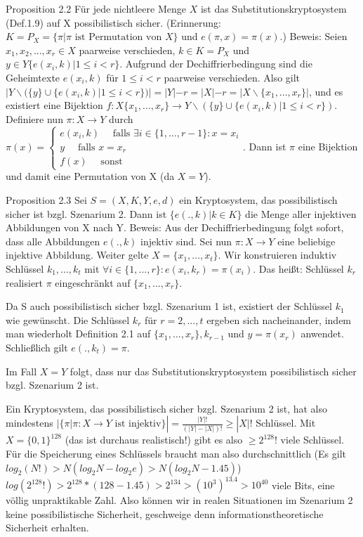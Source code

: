 \documentclass[a4paper]{article}
\begin{document}
\begin{multicols}{3}
    Proposition 2.2 Für jede nichtleere Menge $X$ ist das Substitutionskryptosystem (Def.1.9) auf X possibilistisch sicher. (Erinnerung: $K=P_X=\{\pi|\pi\text{ ist Permutation von }X\}$ und $e(\pi,x)=\pi(x)$.)
    Beweis: Seien $x_1,x_2,...,x_r\in X$ paarweise verschieden, $k\in K=P_X$ und $y\in Y\{e(x_i,k)|1\leq i<r\}$. Aufgrund der Dechiffrierbedingung sind die Geheimtexte $e(x_i,k)$ für $1\leq i<r$ paarweise verschieden. Also gilt $|Y\backslash(\{y\}\cup\{e(x_i,k)| 1\leq i<r\})|=|Y|-r=|X|-r=|X\backslash\{x_1 ,...,x_r\}|$, und es existiert eine Bijektion $f:X\{x_1,...,x_r\}\rightarrow Y\backslash(\{y\}\cup\{e(x_i,k)| 1\leq i<r\})$.
    Definiere nun $\pi:X\rightarrow Y$ durch $\pi(x) =\begin{cases} e(x_i,k)\quad\text{ falls }\exists i\in\{1,...,r-1\}:x=x_i \\ y\quad\text{ falls } x=x_r \\ f(x)\quad\text{ sonst}\end{cases}$.
    Dann ist $\pi$ eine Bijektion und damit eine Permutation von X (da $X=Y$).

    Proposition 2.3 Sei $S=(X,K,Y,e,d)$ ein Kryptosystem, das possibilistisch sicher ist bzgl. Szenarium 2. Dann ist $\{e(.,k)|k\in K\}$ die Menge aller injektiven Abbildungen von X nach Y.
    Beweis: Aus der Dechiffrierbedingung folgt sofort, dass alle Abbildungen $e(.,k)$ injektiv sind.
    Sei nun $\pi:X\rightarrow Y$ eine beliebige injektive Abbildung. Weiter gelte $X=\{x_1,...,x_t\}$. Wir konstruieren induktiv Schlüssel $k_1,...,k_t$ mit $\forall i\in\{1,...,r\}:e(x_i,k_r)=\pi(x_i)$.
    Das heißt: Schlüssel $k_r$ realisiert $\pi$ eingeschränkt auf $\{x_1,...,x_r\}$.

    Da S auch possibilistisch sicher bzgl. Szenarium 1 ist, existiert der Schlüssel $k_1$ wie gewünscht. Die Schlüssel $k_r$ für $r=2,...,t$ ergeben sich nacheinander, indem man wiederholt Definition 2.1 auf $\{x_1,...,x_r\},k_{r-1}$ und $y=\pi(x_r)$ anwendet. Schließlich gilt $e(.,k_t)=\pi$.

    Im Fall $X=Y$ folgt, dass nur das Substitutionskryptosystem possibilistisch sicher bzgl. Szenarium 2 ist.

    Ein Kryptosystem, das possibilistisch sicher bzgl. Szenarium 2 ist, hat also mindestens $|\{\pi |\pi :X\rightarrow Y\text{ ist injektiv}\}|=\frac{|Y|!}{(|Y|-|X|)!} \geq |X|!$ Schlüssel. Mit $X=\{0,1\}^{128}$ (das ist durchaus realistisch!) gibt es also $\geq 2^{128}!$ viele Schlüssel. Für die Speicherung eines Schlüssels braucht man also durchschnittlich (Es gilt $log_2(N!)>N(log_2 N-log_2 e)> N(log_2 N- 1.45)$) $log(2^{128}!)> 2^{128}*(128- 1.45)> 2^{134}>(10^3 )^{13.4} > 10^{40}$ viele Bits, eine völlig unpraktikable Zahl.
    Also können wir in realen Situationen im Szenarium 2 keine possibilistische Sicherheit, geschweige denn informationstheoretische Sicherheit erhalten.


\end{multicols}
\end{document}
